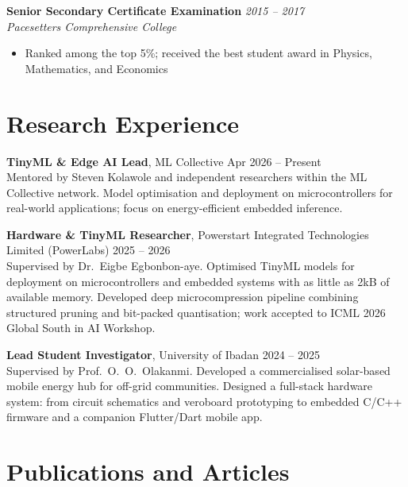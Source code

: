 \documentclass[10pt, a4paper]{article}
\newcommand{\cventry}[4]{%
  \noindent\textbf{#1} \hfill \textit{#2}\\%
  \textit{#3} \hfill \small{#4}\\[-4pt]%
}
\begin{document}
\vspace{4pt}
\cventry{Senior Secondary Certificate Examination}{2015 -- 2017}{Pacesetters Comprehensive College}{}
\begin{itemize}
  \item Ranked among the top 5\%; received the best student award in Physics, Mathematics, and Economics
\end{itemize}

\section{Research Experience}

\noindent\textbf{TinyML \& Edge AI Lead}, ML Collective \hfill Apr 2026 -- Present\\
Mentored by Steven Kolawole and independent researchers within the ML Collective network.
Model optimisation and deployment on microcontrollers for real-world applications; focus on
energy-efficient embedded inference.

\vspace{6pt}
\noindent\textbf{Hardware \& TinyML Researcher}, Powerstart Integrated Technologies Limited (PowerLabs) \hfill 2025 -- 2026\\
Supervised by Dr.\ Eigbe Egbonbon-aye. Optimised TinyML models for deployment on
microcontrollers and embedded systems with as little as 2kB of available memory. Developed deep
microcompression pipeline combining structured pruning and bit-packed quantisation; work accepted
to ICML 2026 Global South in AI Workshop.

\vspace{6pt}
\noindent\textbf{Lead Student Investigator}, University of Ibadan \hfill 2024 -- 2025\\
Supervised by Prof.\ O.\ O.\ Olakanmi. Developed a commercialised solar-based
mobile energy hub for off-grid communities. Designed a full-stack hardware system: from circuit schematics and veroboard prototyping to embedded C/C++ firmware and a companion Flutter/Dart mobile app.


\section{Publications and Articles}
\end{document}
